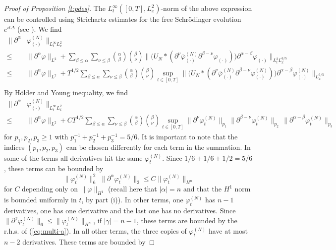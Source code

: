 \documentclass[11pt,a4paper]{article}
\begin{document}
\begin{proof}[Proof of Proposition \ref{t:pdes}]
The $L_t^\infty ([0,T] , L_x^2)$-norm of the above expression can be controlled using
Strichartz estimates for the free Schr\"odinger evolution $e^{it\Delta}$
(see \cite[Theorem 1.2]{KT}). We find
\[\begin{split}
\| \partial^\alpha & \varphi^{(N)}_{(\cdot)} \|_{L_t^\infty L_x^2}  \\ \leq \; & \|
    \partial^\alpha \varphi \|_{L^2} +  \sum_{\beta \le \alpha} \sum_{\nu \le \beta} \binom{\alpha}{\beta}
    \binom{\beta}{\nu} \| \big( U_N * (\partial^\nu
    \overline{\varphi}^{(N)}_{(\cdot)} \partial^{\beta - \nu} \varphi_{(\cdot)})
    \big) \partial^{\alpha - \beta} \varphi_{(\cdot)} \|_{L_t^2 L_x^{6/5}} \\
     \leq \; & \|
    \partial^\alpha \varphi \|_{L^2} +  T^{1/2} \sum_{\beta \le \alpha} \sum_{\nu \le \beta} \binom{\alpha}{\beta}
    \binom{\beta}{\nu}  \sup_{t \in [0,T]} \| \big( U_N * (\partial^\nu
    \overline{\varphi}^{(N)}_{(\cdot)} \partial^{\beta - \nu} \varphi^{(N)}_{(\cdot)})
    \big) \partial^{\alpha - \beta} \varphi^{(N)}_{(\cdot)} \|_{L_x^{6/5}} \\
\end{split} \]    
By H\"older and Young inequality, we find 
\[ \begin{split}
\| \partial^\alpha & \varphi^{(N)}_{(\cdot)} \|_{L_t^\infty L_x^2} \\ \leq \; & \|
    \partial^\alpha \varphi \|_{L^2} + C T^{1/2}  \sum_{\beta \le \alpha} \sum_{\nu \le \beta}
    \binom{\alpha}{\beta} \binom{\beta}{\nu} \sup_{t \in [0,T]} \|
    \partial^\nu \varphi_t^{(N)} \|_{p_1} \| \partial^{\beta - \nu} \varphi_t^{(N)}
    \|_{p_2} \, \| \partial^{\alpha - \beta} \varphi_t^{(N)}
    \|_{p_3} 
  \end{split}\]
for $p_1, p_2, p_3 \geq 1$ with $p_1^{-1} + p_2^{-1} + p_3^{-1} = 5/6$. It is important to note that the indices $(p_1, p_2, p_3)$ can be chosen differently for each term in the summation. In some of the terms all derivatives hit the same $\varphi_t^{(N)}$. Since $1/6 + 1/6 + 1/2 = 5/6$, these terms can be bounded by
\begin{equation}\label{eq:multi-a}  \| \varphi_t^{(N)} \|^2_{6} \; \| \partial^\alpha \varphi_t^{(N)} \|_{2} \leq C \| \varphi_t^{(N)} \|_{H^n} \end{equation} for $C$ depending only on $\| \varphi \|_{H^1}$ (recall here that $|\alpha| = n$ and that the $H^1$ norm is bounded uniformly in $t$, by part (i)). In other terms, one $\varphi_t^{(N)}$ has $n - 1$ derivatives, one has one derivative and the last one has no derivatives. Since $\| \partial^{\gamma} \varphi_t^{(N)} \|_6 \leq \| \varphi_t^{(N)} \|_{H^n}$, if $|\gamma| = n-1$, these terms are bounded by the r.h.s. of (\ref{eq:multi-a}). In all other terms, the three copies of $\varphi_t^{(N)}$ have at most $n-2$ derivatives. These terms are bounded by 

\end{proof}
\end{document}

